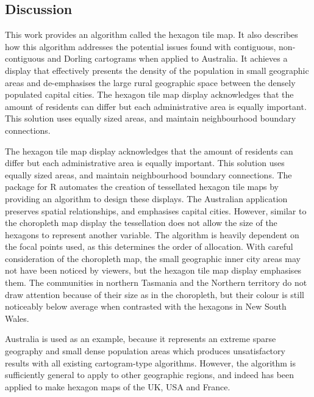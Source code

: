 \hypertarget{discussion}{%
\subsection{Discussion}\label{discussion}}

This work provides an algorithm called the hexagon tile map. It also
describes how this algorithm addresses the potential issues found with
contiguous, non-contiguous and Dorling cartograms when applied to
Australia. It achieves a display that effectively presents the density
of the population in small geographic areas and de-emphasises the large
rural geographic space between the densely populated capital cities. The
hexagon tile map display acknowledges that the amount of residents can
differ but each administrative area is equally important. This solution
uses equally sized areas, and maintain neighbourhood boundary
connections.

The hexagon tile map display acknowledges that the amount of residents
can differ but each administrative area is equally important. This
solution uses equally sized areas, and maintain neighbourhood boundary
connections. The  package for R automates the creation of
tessellated hexagon tile maps by providing an algorithm to design these
displays. The Australian application preserves spatial relationships,
and emphasises capital cities. However, similar to the choropleth map
display the tessellation does not allow the size of the hexagons to
represent another variable. The algorithm is heavily dependent on the
focal points used, as this determines the order of allocation. With
careful consideration of the choropleth map, the small geographic inner
city areas may not have been noticed by viewers, but the hexagon tile
map display emphasises them. The communities in northern Tasmania and
the Northern territory do not draw attention because of their size as in
the choropleth, but their colour is still noticeably below average when
contrasted with the hexagons in New South Wales.

Australia is used as an example, because it represents an extreme sparse
geography and small dense population areas which produces unsatisfactory
results with all existing cartogram-type algorithms. However, the
algorithm is sufficiently general to apply to other geographic regions,
and indeed has been applied to make hexagon maps of the UK, USA and
France.


